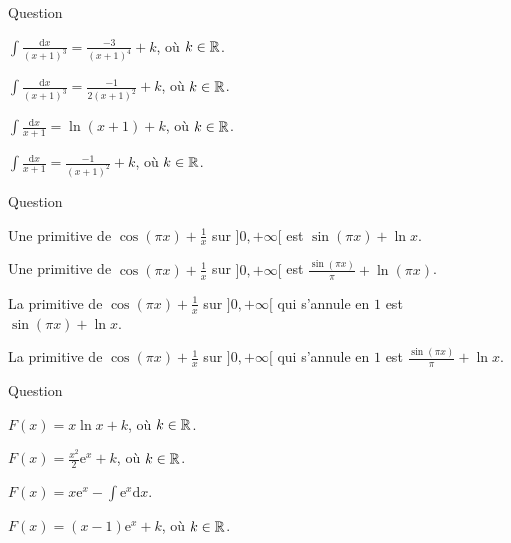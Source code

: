 \begin{multi}[multiple,feedback=
{Avec \(u=1+x\), on a : \(\mathrm{d}u=\mathrm{d}x\),
\[\int \frac{\mathrm{d}x}{(x+1)^3}=\int u^{-3}\mathrm{d}u=\frac{-1}{2}u^{-2}+k=\frac{-1}{2(x+1)^2}+k,\; k\in \Rr,\]
et \(\displaystyle \int \frac{\mathrm{d}x}{x+1}=\int \frac{\mathrm{d}u}{u}=\ln |u|+k=\ln (x+1)+k\), \(k\in \Rr\).
}]{Question}
    \item \(\displaystyle \int \frac{\mathrm{d}x}{(x+1)^3}=\frac{-3}{(x+1)^4}+k\), où \(k\in \Rr\).
    \item* \(\displaystyle \int \frac{\mathrm{d}x}{(x+1)^3}=\frac{-1}{2(x+1)^2}+k\), où \(k\in \Rr\).
    \item* \(\displaystyle \int \frac{\mathrm{d}x}{x+1}=\ln (x+1)+k\), où \(k\in \Rr\).
    \item \(\displaystyle \int \frac{\mathrm{d}x}{x+1}=\frac{-1}{(x+1)^2}+k\), où \(k\in \Rr\).
\end{multi}


\begin{multi}{Question}
    \item Une primitive de \(\displaystyle \cos (\pi x)+\frac{1}{x}\) sur \(]0,+\infty[\) est \(\displaystyle \sin (\pi x)+\ln x\).
    \item* Une primitive de \(\displaystyle \cos (\pi x)+\frac{1}{x}\) sur \(]0,+\infty[\) est \(\displaystyle \frac{\sin (\pi x)}{\pi}+\ln (\pi x)\).
    \item La primitive de \(\displaystyle \cos (\pi x)+\frac{1}{x}\) sur \(]0,+\infty[\) qui s'annule en \(1\) est \(\displaystyle \sin (\pi x)+\ln x\).
    \item* La primitive de \(\displaystyle \cos (\pi x)+\frac{1}{x}\) sur \(]0,+\infty[\) qui s'annule en \(1\) est \(\displaystyle \frac{\sin (\pi x)}{\pi}+\ln x\).
\end{multi}


\begin{multi}[multiple,feedback=
{Une intégration par parties avec \(u=x\) et \(v=\mathrm{e}^x\) donne
\[F(x)=x\mathrm{e}^x-\int \mathrm{e}^x\mathrm{d}x=x\mathrm{e}^x-\mathrm{e}^x+k,\mbox{ où }k\in \Rr.\]
}]{Question}
    \item \(\displaystyle F(x)=x\ln x+k\), où \(k\in \Rr\).
    \item \(\displaystyle F(x)=\frac{x^2}{2}\mathrm{e}^x+k\), où \(k\in \Rr\).
    \item* \(\displaystyle F(x)=x\mathrm{e}^x-\int \mathrm{e}^x\mathrm{d}x\).
    \item* \(\displaystyle F(x)=(x-1)\mathrm{e}^x+k\), où \(k\in \Rr\).
\end{multi}


